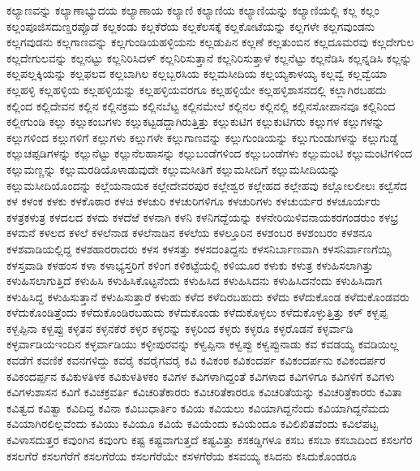{ಕಲ್ಯಾಣವನ್ನು
ಕಲ್ಯಾಣಾಭ್ಯುದಯ
ಕಲ್ಯಾಣಾಯ
ಕಲ್ಯಾಣಿ
ಕಲ್ಯಾಣಿಯ
ಕಲ್ಯಾಣಿಯನ್ನು
ಕಲ್ಯಾಣಿಯಲ್ಲಿ
ಕಲ್ಲ
ಕಲ್ಲಂ
ಕಲ್ಲಂಪೂಜಿಸದುಣ್ಡರಪ್ಪೊಡೆ
ಕಲ್ಲಕಂಡು
ಕಲ್ಲಕೆರೆಯ
ಕಲ್ಲಕೆಲಸಕ್ಕೆ
ಕಲ್ಲಕೋಟೆಯನ್ನು
ಕಲ್ಲಗಳೇ
ಕಲ್ಲಗವುಂಡನು
ಕಲ್ಲಗವುಡನು
ಕಲ್ಲಗಾಣವನ್ನು
ಕಲ್ಲಗುಂಡಿಯಹಳ್ಳಿಯನು
ಕಲ್ಲಡುಪಿನ
ಕಲ್ಲಣೆ
ಕಲ್ಲತುಂಬಿನ
ಕಲ್ಲದೂಮರವು
ಕಲ್ಲದೇಗುಲ
ಕಲ್ಲದೇಗುಲವನ್ನು
ಕಲ್ಲನಟ್ಟು
ಕಲ್ಲನಿರಿಸಿದಳ್
ಕಲ್ಲನಿರಿಸುತ್ತಾನೆ
ಕಲ್ಲನಿರಿಸುತ್ತಾಳೆ
ಕಲ್ಲನೆಟ್ಟು
ಕಲ್ಲನೆಡಿಸಿ
ಕಲ್ಲನ್ನಡಿಸಿ
ಕಲ್ಲನ್ನು
ಕಲ್ಲಪಲ್ಲಕ್ಕಿಯನ್ನು
ಕಲ್ಲಫಲವ
ಕಲ್ಲಬಾಗಿಲ
ಕಲ್ಲಬ್ಬರಸಿಯ
ಕಲ್ಲಮಸೀದಿಯ
ಕಲ್ಲಯ್ಯಕಾಳಯ್ಯ
ಕಲ್ಲವ್ವೆ
ಕಲ್ಲವ್ವೆಯಾ
ಕಲ್ಲಹಳ್ಳಿ
ಕಲ್ಲಹಳ್ಳಿಯ
ಕಲ್ಲಹಳ್ಳಿಯನ್ನು
ಕಲ್ಲಹಳ್ಳಿಯವರಗೂ
ಕಲ್ಲಹಳ್ಳಿಯೇ
ಕಲ್ಲಹಳ್ಳಿಶಾಸನದಲ್ಲಿ
ಕಲ್ಲಾಗಿರಬಹದು
ಕಲ್ಲಿಂದ
ಕಲ್ಲಿದೇವನ
ಕಲ್ಲಿನ
ಕಲ್ಲಿನಕ್ರಮ
ಕಲ್ಲಿನಬೆಟ್ಟ
ಕಲ್ಲಿನಮೇಲೆ
ಕಲ್ಲಿನಲ
ಕಲ್ಲಿನಲ್ಲಿ
ಕಲ್ಲಿನಸೋಪಾನವೂ
ಕಲ್ಲಿನಿಂದ
ಕಲ್ಲೀಗುಂಡಿ
ಕಲ್ಲು
ಕಲ್ಲುಕಂಬಗಳು
ಕಲ್ಲುಕಟ್ಟಡದ್ದಾಗಿರುತ್ತಿತ್ತು
ಕಲ್ಲುಕುಟಿಗ
ಕಲ್ಲುಕುಟಿಗರು
ಕಲ್ಲುಗಳ
ಕಲ್ಲುಗಳನ್ನು
ಕಲ್ಲುಗಳಿಂದ
ಕಲ್ಲುಗಳಿಗೆ
ಕಲ್ಲುಗಳು
ಕಲ್ಲುಗಳೇ
ಕಲ್ಲುಗಾಣವನ್ನು
ಕಲ್ಲುಗುಂಡಿಯನ್ನು
ಕಲ್ಲುಗುಂಡುಗಳನ್ನು
ಕಲ್ಲುಗುಡ್ಡೆ
ಕಲ್ಲುಚಪ್ಪಡಿಗಳನ್ನು
ಕಲ್ಲುನೆಟ್ಟು
ಕಲ್ಲುನೆಲಹಾಸನ್ನು
ಕಲ್ಲುಬಂಡೆಗಳಿಂದ
ಕಲ್ಲುಬಂಡೆಗಳು
ಕಲ್ಲುಮಂಟಿ
ಕಲ್ಲುಮಂಟಿಗಳಿಂದ
ಕಲ್ಲುಮಣ್ಣನ್ನು
ಕಲ್ಲುಮರಡಿಯೊಳಾಡುವುದೇ
ಕಲ್ಲುಮಸೀತಿಗೆ
ಕಲ್ಲುಮಸೀದಿಗೆ
ಕಲ್ಲುಮಸೀದಿಯನ್ನು
ಕಲ್ಲುಮಸೀದಿಯೊಂದನ್ನು
ಕಲ್ಲೆಯನಾಯಕ
ಕಲ್ಲೇದೇವರಪುರ
ಕಲ್ಲೇಶ್ವರ
ಕಲ್ಲೇಹದ
ಕಲ್ಲೇಹವು
ಕಲ್ಲೋಲಲೀಲಃ
ಕಲ್ವೆಸೆದ
ಕಳ
ಕಳಂಕ
ಕಳಕು
ಕಳಕೊಠಾರ
ಕಳಚಿ
ಕಳಚುರಿ
ಕಳಚುರಿಗಳಿಗೂ
ಕಳಚುರಿಗಳು
ಕಳಚುರ್ಯರ
ಕಳಚೂರ್ಯರು
ಕಳತ್ರಕಳುತ್ರ
ಕಳದಲದ
ಕಳದು
ಕಳದೆಱೆ
ಕಳನಾಗಿ
ಕಳನಿ
ಕಳನಿಗದ್ದೆಯನ್ನು
ಕಳನೇರಿಯಿಳಿವನಾಯಕರಗಂಡರುಂ
ಕಳಭ್ರ
ಕಳಮನೆ
ಕಳಲದ
ಕಳಲೆ
ಕಳಲೆನಾಡ
ಕಳಲೆನಾಡಿನ
ಕಳಲೆಯ
ಕಳಲ್ತೂರಿನ
ಕಳಶಂಬರ
ಕಳಶಂಬರಂ
ಕಳಶನೂ
ಕಳಶವಾಡಿಯಲ್ಲಿದ್ದ
ಕಳಶಹಾರರಾದರು
ಕಳಸ
ಕಳಸತ್ತು
ಕಳಸದಂತಿದ್ದನು
ಕಳಸನಿರ್ಬಾಣವಾಗಿ
ಕಳಸನಿರ್ವಾಣಗೆಯ್ಸಿ
ಕಳಸ್ತವಾಡಿ
ಕಳಹಂಸ
ಕಳಾ
ಕಳಾಭ್ಯಸ್ತರಿಗೆ
ಕಳಿಂಗ
ಕಳಿಕಟ್ಟೆಯಲ್ಲಿ
ಕಳಿಯೂರ
ಕಳುಕು
ಕಳುತ್ರ
ಕಳುಹಿಸಲಾಗಿತ್ತು
ಕಳುಹಿಸಲಾಗುತ್ತಿದೆ
ಕಳುಹಿಸಿ
ಕಳುಹಿಸಿಕೊಟ್ಟನೆಂದು
ಕಳುಹಿಸಿದ
ಕಳುಹಿಸಿದನು
ಕಳುಹಿಸಿದನೆಂದು
ಕಳುಹಿಸಿದಾಗ
ಕಳುಹಿಸಿದ್ದ
ಕಳುಹಿಸುತ್ತಾನೆ
ಕಳುಹಿಸುತ್ತಾರೆ
ಕಳುಹು
ಕಳೆದ
ಕಳೆದಿರಬಹುದು
ಕಳೆದು
ಕಳೆದುಕೊಂಡ
ಕಳೆದುಕೊಂಡವರು
ಕಳೆದುಕೊಂಡಿತ್ತೆಂದು
ಕಳೆದುಕೊಂಡಿರಬಹುದು
ಕಳೆದುಕೊಂಡು
ಕಳೆದುಕೊಳ್ಳಲು
ಕಳೆದುಕೊಳ್ಳುತ್ತಿತ್ತು
ಕಳ್
ಕಳ್ಬಪ್ಪ
ಕಳ್ಬಪ್ಪಿನಾ
ಕಳ್ಬಪ್ಪು
ಕಳ್ಳತನ
ಕಳ್ಳನಕೆರೆ
ಕಳ್ಳರ
ಕಳ್ಳರನ್ನು
ಕಳ್ಳರಿಂದ
ಕಳ್ಳರು
ಕಳ್ಳರೂ
ಕಳ್ಳರೊಡನೆ
ಕಳ್ಳರ್ವಾಡಿ
ಕಳ್ಳರ್ವಾಡಿಯಇಂದಿನ
ಕಳ್ಳರ್ವಾಡಿಯು
ಕಳ್ಳೀಪುರವನ್ನು
ಕಳ್ವಪ್ಪಿನಾ
ಕಳ್ವಪ್ಪು
ಕಳ್ವಪ್ಪುನಾಡು
ಕವ
ಕವಡಯ್ಯ
ಕವಡಿಯಿಲ್ಲ
ಕವಡೆಗೆ
ಕವಣಿಕೆ
ಕವನಗಳಿದ್ದು
ಕವರೈ
ಕವರೈಗವರೈ
ಕವಿ
ಕವಿಕಂಠ
ಕವಿಕಂದರ್ಪ
ಕವಿಕಂದರ್ಪನು
ಕವಿಕಂದರ್ಪರ
ಕವಿಕಂದರ್ಪ್ಪನ
ಕವಿಕುಳತಿಳಕ
ಕವಿಕುಳತಿಳಕಂ
ಕವಿಗಳ
ಕವಿಗಳಾಗಿದ್ದಂತೆ
ಕವಿಗಳಾದ
ಕವಿಗಳಿಗೂ
ಕವಿಗಳಿಗೆ
ಕವಿಗಳು
ಕವಿಗಳುಶಾಸನ
ಕವಿಗೆ
ಕವಿಚಕ್ರವರ್ತಿ
ಕವಿಚರಿತೆಕಾರರು
ಕವಿಚರಿತೆಕಾರರೂ
ಕವಿಚರಿತೆಯನ್ನು
ಕವಿಚರಿತ್ರೆಕಾರರು
ಕವಿತಾ
ಕವಿತ್ವದ
ಕವಿತ್ವಾ
ಕವಿದಿದ್ದ
ಕವಿನಾ
ಕವಿಬುಧಾರ್ತಿಂ
ಕವಿಯ
ಕವಿಯಲು
ಕವಿಯಾಗಿದ್ದನೆಂದು
ಕವಿಯಾಗಿದ್ದನೆಮದು
ಕವಿಯಾಗಿರಲಿಲ್ಲವೆಂದು
ಕವಿಯು
ಕವಿಯೂ
ಕವಿಯೆ
ಕವಿಯೆಂದು
ಕವಿಯೆಂದೂ
ಕವಿಲಿಖಿತವೆಂದು
ಕವಿಲೆಪಟ್ಟ
ಕವಿಳಾಸದುತ್ತರ
ಕವುಂಗಿನ
ಕವುಂಗು
ಕಷ್ಟ
ಕಷ್ಟವಾಗುತ್ತದೆ
ಕಷ್ಟವಿತ್ತು
ಕಸಕಡ್ಡಿಗಳೂ
ಕಸಬ
ಕಸಬಾ
ಕಸಬಾದಿಂದ
ಕಸಲಗೆರ
ಕಸಲಗೆರೆ
ಕಸಲಗೆರೆಗೆ
ಕಸಲಗೆರೆಯ
ಕಸಲಗೆರೆಯೇ
ಕಸಳಗೆರೆಯ
ಕಸವಯ್ಯ
ಕಸಿದನು
ಕಸಿದುಕೊಂಡರೂ
}
